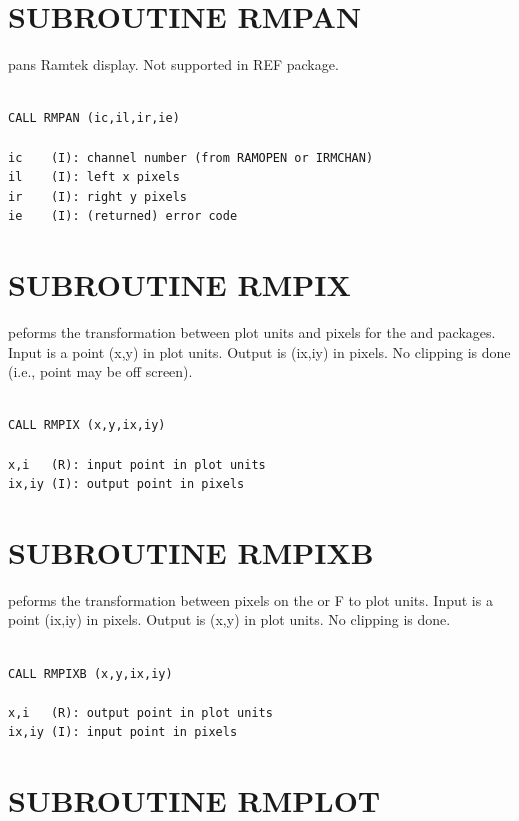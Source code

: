 \documentclass[11pt]{report}
\begin{document}
\section{SUBROUTINE RMPAN}

 pans Ramtek display.  Not supported in REF package.
\begin{verbatim}

CALL RMPAN (ic,il,ir,ie)

ic    (I): channel number (from RAMOPEN or IRMCHAN)
il    (I): left x pixels
ir    (I): right y pixels
ie    (I): (returned) error code
\end{verbatim}

\section{SUBROUTINE RMPIX}

 peforms the transformation between plot units and pixels for the
 and  packages.  Input is a point (x,y) in plot units. Output
is (ix,iy) in pixels.  No clipping is done (i.e., point may be off screen).
\begin{verbatim}

CALL RMPIX (x,y,ix,iy)

x,i   (R): input point in plot units
ix,iy (I): output point in pixels
\end{verbatim}

\section{SUBROUTINE RMPIXB}

 peforms the transformation between pixels on the  or F
to plot units.  Input is a point (ix,iy) in pixels.  Output is (x,y)
in plot units.  No clipping is done.
\begin{verbatim}

CALL RMPIXB (x,y,ix,iy)

x,i   (R): output point in plot units
ix,iy (I): input point in pixels
\end{verbatim}

\section{SUBROUTINE  RMPLOT}
\end{document}

